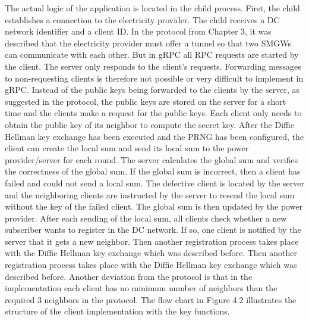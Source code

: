 The actual logic of the application is located in the child process. First, the child establishes a connection to the electricity provider. The child receives a DC network identifier and a client ID. In the protocol from Chapter 3, it was described that the electricity provider must offer a tunnel so that two SMGWs can communicate with each other. But in gRPC all RPC requests are started by the client. The server only responds to the client's requests. Forwarding messages to non-requesting clients is therefore not possible or very difficult to implement in gRPC. Instead of the public keys being forwarded to the clients by the server, as suggested in the protocol, the public keys are stored on the server for a short time and the clients make a request for the public keys. Each client only needs to obtain the public key of its neighbor to compute the secret key. After the Diffie Hellman key exchange has been executed and the PRNG has been configured, the client can create the local sum and send its local sum to the power provider/server for each round. The server calculates the global sum and verifies the correctness of the global sum. If the global sum is incorrect, then a client has failed and could not send a local sum. The defective client is located by the server and the neighboring clients are instructed by the server to resend the local sum without the key of the failed client. The global sum is then updated by the power provider. After each sending of the local sum, all clients check whether a new subscriber wants to register in the DC network. If so, one client is notified by the server that it gets a new neighbor. Then another registration process takes place with the Diffie Hellman key exchange which was described before. Then another registration process takes place with the Diffie Hellman key exchange which was described before. Another deviation from the protocol is that in the implementation each client has no minimum number of neighbors than the required 3 neighbors in the protocol. The flow chart in Figure 4.2 illustrates the structure of the client implementation with the key functions.
